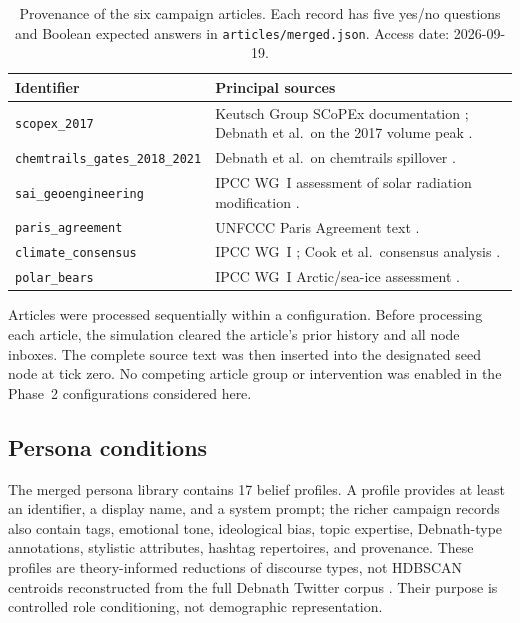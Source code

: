 \begin{table}[tbp]
  \centering
  \caption{Provenance of the six campaign articles. Each record has five
  yes/no questions and Boolean expected answers in
  \texttt{articles/merged.json}. Access date: 2026-09-19.}
  \label{tab:article-provenance}
  \small
  \begin{tabularx}{\textwidth}{@{}lX@{}}
    \toprule
    Identifier & Principal sources \\
    \midrule
    \texttt{scopex\_2017} &
      Keutsch Group SCoPEx documentation \parencite{keutsch2024scopex};
      Debnath et al.\ on the 2017 volume peak
      \parencite{debnath2023conspiracy}. \\
    \texttt{chemtrails\_gates\_2018\_2021} &
      Debnath et al.\ on chemtrails spillover
      \parencite{debnath2023conspiracy}. \\
    \texttt{sai\_geoengineering} &
      IPCC WG~I assessment of solar radiation modification
      \parencite{ipcc2021ar6}. \\
    \texttt{paris\_agreement} &
      UNFCCC Paris Agreement text \parencite{unfccc2015paris}. \\
    \texttt{climate\_consensus} &
      IPCC WG~I \parencite{ipcc2021ar6}; Cook et al.\ consensus analysis
      \parencite{cook2013consensus}. \\
    \texttt{polar\_bears} &
      IPCC WG~I Arctic/sea-ice assessment \parencite{ipcc2021ar6}. \\
    \bottomrule
  \end{tabularx}
\end{table}

Articles were processed sequentially within a configuration. Before processing
each article, the simulation cleared the article's prior history and all node
inboxes.
The complete source text was then inserted into the designated seed node at
tick zero.  No competing article group or intervention was enabled in the
Phase~2 configurations considered here.

\subsection{Persona conditions}
\label{subsec:simulation-personas}

The merged persona library contains 17 belief profiles.  A profile provides at
least an identifier, a display name, and a system prompt; the richer campaign
records also contain tags, emotional tone, ideological bias, topic expertise,
Debnath-type annotations, stylistic attributes, hashtag repertoires, and
provenance.  These profiles are theory-informed reductions of discourse types,
not HDBSCAN centroids reconstructed from the full Debnath Twitter corpus
\parencite{debnath2023conspiracy}.  Their purpose is controlled role
conditioning, not demographic representation.

